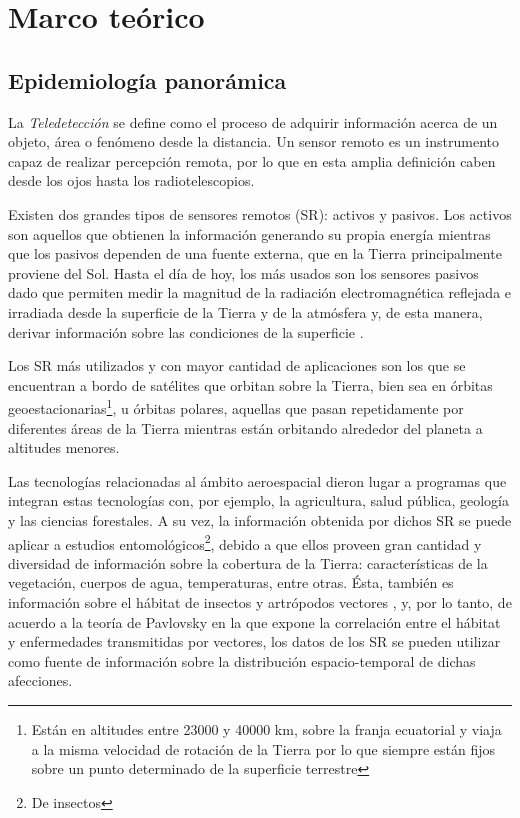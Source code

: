 %
%
%

\chapter{Marco teórico}

\section{Epidemiología panorámica}

\justifying


\par La \textit{Teledetección} se define como el proceso de adquirir
  información acerca de un objeto, área o fenómeno desde la distancia.
  Un sensor remoto es un instrumento capaz de realizar percepción remota, por lo
  que en esta amplia definición caben desde los ojos hasta los
  radiotelescopios.

\par Existen dos grandes tipos de sensores remotos (SR): activos y pasivos.
  Los activos son aquellos que obtienen la información generando su propia energía
  mientras que los pasivos dependen de una fuente externa, que en la Tierra
  principalmente proviene del Sol. Hasta el día de hoy, los más usados son los
  sensores pasivos dado que permiten medir la magnitud de la radiación electromagnética
  reflejada e irradiada desde la superficie de la Tierra y de la atmósfera y,
  de esta manera, derivar información sobre las condiciones de la superficie \cite{cami_tartagal}.


\par Los SR más utilizados y con mayor cantidad de aplicaciones son los que se
  encuentran a bordo de satélites que orbitan sobre la Tierra, bien sea
  en órbitas geoestacionarias\footnote{Están en altitudes entre 23000 y 40000 km,
  sobre la franja ecuatorial y viaja a la misma velocidad de rotación de la Tierra
  por lo que siempre están fijos sobre un punto determinado de la superficie terrestre},
  u órbitas polares, aquellas que pasan repetidamente por diferentes áreas
  de la Tierra mientras están orbitando alrededor del planeta a altitudes menores.


\par Las tecnologías relacionadas al ámbito aeroespacial dieron lugar a programas
  que integran estas tecnologías con,
  por ejemplo, la agricultura, salud pública, geología y las ciencias forestales.
  A su vez, la información obtenida por dichos SR se puede aplicar a estudios
  entomológicos\footnote{De insectos}, debido a que ellos proveen gran cantidad
  y diversidad de información sobre la cobertura de la Tierra: características
  de la vegetación, cuerpos de agua, temperaturas, entre otras. Ésta, también es
  información sobre el hábitat de insectos y artrópodos vectores \cite{ndwi_erffectiveness, data_driven_prediction},
  y, por lo tanto, de acuerdo a la teoría de Pavlovsky \cite{nidality} en la que
  expone la correlación entre el hábitat y enfermedades transmitidas por vectores,
  los datos de los SR se pueden utilizar como fuente de información sobre la
  distribución espacio-temporal de dichas afecciones.


